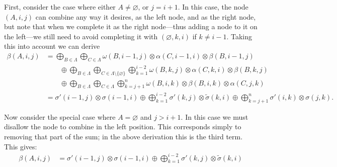     First, consider the case where either $A \neq \varnothing$, or $j = i + 1$. In this case, the node $(A, i, j)$ can combine any way it desires, as the left node, and as the right node, but note that when we complete it as the right node---thus adding a node to it on the left---we still need to avoid completing it with $(\varnothing, k, i)$ if $k \neq i-1$. Taking this into account we can derive
    \begin{align}
      \label{eq:outside-pruned}
      \beta(A, i, j)
        &= \bigoplus_{B \in \Lambda} \bigoplus_{C \in \Lambda}  \omega(B, i-1, j) \otimes \alpha(C, i-1, i) \otimes \beta(B, i-1, j)  \\
          &\qquad \oplus \bigoplus_{B \in \Lambda} \bigoplus_{C \in \Lambda \setminus \{ \varnothing \}} \bigoplus_{k=1}^{i-2} \omega(B, k, j) \otimes \alpha(C, k, i) \otimes \beta(B, k, j) \\
          &\qquad \oplus \bigoplus_{B \in \Lambda} \bigoplus_{C \in \Lambda} \bigoplus_{k=j+1}^{n} \omega(B, i, k) \otimes \beta(B, i, k) \otimes \alpha(C, j, k)  \\
        &= \sigma'(i-1, j) \otimes \sigma(i-1, i) \oplus \bigoplus_{k=1}^{i-2} \sigma'(k, j) \otimes \tilde{\sigma}(k, i) \oplus \bigoplus_{k=j+1}^{n} \sigma'(i, k) \otimes \sigma(j, k).
    \end{align}

    Now consider the special case where $ A = \varnothing$ and $j > i + 1$. In this case we must disallow the node to combine in the left position. This corresponds simply to removing that part of the sum; in the above derivation this is the third term. This gives:
    \begin{align}
      \beta(A, i, j) &=
        \sigma'(i-1, j) \otimes \sigma(i-1, i) \oplus \displaystyle\bigoplus_{k=1}^{i-2} \sigma'(k, j) \otimes \tilde{\sigma}(k, i)
    \end{align}


